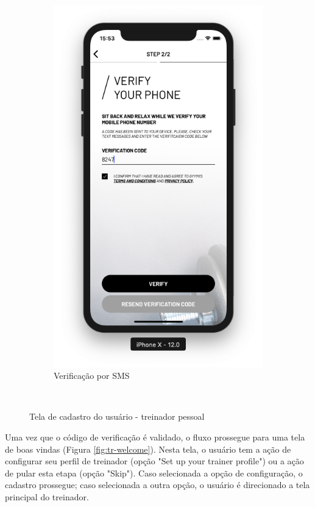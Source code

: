 \begin{figure}[h]
\begin{subfigure}[b]{0.4\textwidth}
        \includegraphics[width=\textwidth]{pfc/figuras/register-trainer-verification.png}
        \caption{Verificação por SMS}
        \label{fig:register-trainer-verification}
    \end{subfigure}
    ~
    \caption{Tela de cadastro do usuário - treinador pessoal}
    \label{fig:register-trainer}
\end{figure}

Uma vez que o código de verificação é validado, o fluxo prossegue para uma tela de boas vindas (Figura \ref{fig:tr-welcome}). Nesta tela, o usuário tem a ação de configurar seu perfil de treinador (opção "Set up your trainer profile") ou a ação de pular esta etapa (opção "Skip"). Caso selecionada a opção de configuração, o cadastro prossegue; caso selecionada a outra opção, o usuário é direcionado a tela principal do treinador.

